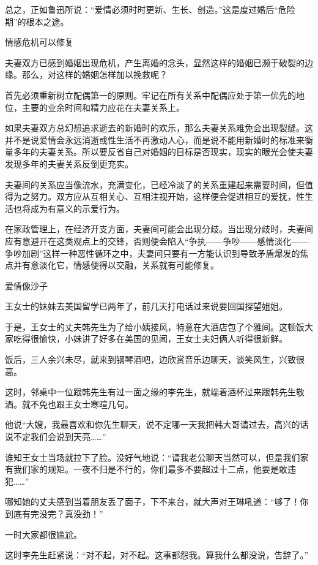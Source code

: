 \documentclass[12pt,UTF8]{ctexbook}
\begin{document}
总之，正如鲁迅所说：“爱情必须时时更新、生长、创造。”这是度过婚后“危险期”的根本之途。





情感危机可以修复


夫妻双方已感到婚姻出现危机，产生离婚的念头，显然这样的婚姻已濒于破裂的边缘。那么，对这样的婚姻怎样加以挽救呢？

首先必须重新树立配偶第一的原则。牢记在所有关系中配偶应处于第一优先的地位，主要的业余时间和精力应花在夫妻关系上。

如果夫妻双方总幻想追求逝去的新婚时的欢乐，那么夫妻关系难免会出现裂缝。这并不是说爱情会永远消逝或性生活不再激动人心，而是说不能用新婚时的标准来衡量多年的夫妻关系。所以要反省自己对婚姻的目标是否现实，现实的眼光会使夫妻发现多年的夫妻关系反倒更充实。

夫妻间的关系应当像流水，充满变化，已经冷淡了的关系重建起来需要时间，但值得为之努力。双方应从互相关心、互相注视开始，这样便会促进相互的爱抚，性生活也将成为有意义的示爱行为。

在家政管理上，在经济开支方面，夫妻间可能会出现分歧。当出现分歧时，夫妻间应有意避开在这类观点上的交锋，否则便会陷入“争执——争吵——感情淡化——争吵加剧”这样一种恶性循环之中，夫妻间只要有一方能认识到导致矛盾爆发的焦点并有意淡化它，情感便得以交融，关系就有可能修复。





爱情像沙子


王女士的妹妹去美国留学已两年了，前几天打电话过来说要回国探望姐姐。

于是，王女士的丈夫韩先生为了给小姨接风，特意在大酒店包了个雅间。这顿饭大家吃得很愉快，小妹讲了好多在美国的见闻，王女士夫妇俩人听得很新鲜。

饭后，三人余兴未尽，就来到钢琴酒吧，边欣赏音乐边聊天，谈笑风生，兴致很高。

这时，邻桌中一位跟韩先生有过一面之缘的李先生，就端着酒杯过来跟韩先生敬酒。就不免也跟王女士寒暄几句。

他说“大嫂，我最喜欢和你先生聊天，说不定哪一天我把韩大哥请过去，高兴的话说不定我们会说到天亮……”

谁知王女士当场就拉下了脸。没好气地说：“请我老公聊天当然可以，但是我们家有我们家的规矩。一夜不归是不行的，你们最多不要超过十二点，他要是敢违犯……”

哪知她的丈夫感到当着朋友丢了面子，下不来台，就大声对王琳吼道：“够了！你到底有完没完？真没劲！”

一时大家都很尴尬。

这时李先生赶紧说：“对不起，对不起。这事都怨我。算我什么都没说，告辞了。”
\end{document}
